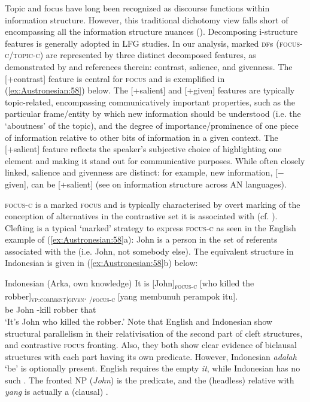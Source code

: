 \documentclass[output=paper,chinesefont]{../langscibook}
\begin{document}
Topic and focus have long been recognized as discourse functions within information structure. However, this traditional dichotomy view falls short of encompassing all the information structure nuances (). Decomposing i-structure features is generally adopted in LFG studies. In our analysis, marked \textsc{df}s (\textsc{focus-c}/\textsc{topic-c}) are represented by three distinct decomposed features, as demonstrated by \citet{Arka2018} and references therein: contrast, salience, and givenness.  The [+contrast] feature is central for \textsc{focus} and is exemplified in (\ref{ex:Austronesian:58}) below. The [+salient] and [+given] features are typically topic-related, encompassing communicatively important properties, such as the particular frame/entity by which new information should be understood (i.e. the `aboutness' of the topic), and the degree of importance/prominence of one piece of information relative to other bits of information in a given context. The [+salient] feature reflects the speaker's subjective choice of highlighting one element and making it stand out for communicative purposes. While often closely linked, salience and givenness are distinct: for example, new information, \mbox{[$-$given]}, can be [+salient] (see \citealt{Riesberg2018} on information structure across AN languages).

\textsc{focus-c} is a marked \textsc{focus} and is typically characterised by overt marking of the conception of alternatives in the contrastive set it is associated with (cf. \citealt{Krifka}). Clefting is a typical `marked' strategy to express \textsc{focus-c} as seen in the English example of (\ref{ex:Austronesian:58}a): John is a person in the set of referents associated with the \SUBJ(i.e. John, not somebody else). The equivalent structure in Indonesian is given in (\ref{ex:Austronesian:58}b) below:

\ea\label{ex:Austronesian:58} Indonesian  (Arka, own knowledge)
\ea It is [John]\textsubscript{\textsc{focus-c}} [who killed the robber]\textsubscript{\textsc{vp:comment|given}}.
\ex{}\textsubscript{\PRED/\textsc{focus-c}} [yang membunuh perampok itu]\textsubscript{\SUBJ}. \\
 \phantom{[(}be John \phantom{[}{\REL} \AV-kill robber that\\
\glt`It's John who killed the robber.'
\z\z
Note that English and Indonesian show structural parallelism in their relativisation of the second part of cleft structures, and contrastive \textsc{focus} fronting. Also, they both show clear evidence of biclausal structures with each part having its own predicate. However, Indonesian \emph{adalah} `be' is optionally present. English requires the empty \SUBJ \emph{it}, while Indonesian has no such \SUBJ. The fronted NP (\emph{John}) is the predicate, and the (headless) relative with \emph{yang} is actually a (clausal) \SUBJ.
\end{document}
